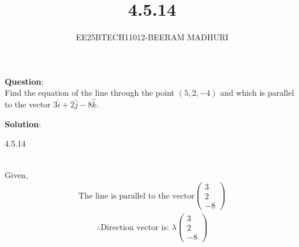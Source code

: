 \documentclass[journal]{IEEEtran}
\begin{document}

\vspace{3cm}

\title{4.5.14}
\author{EE25BTECH11012-BEERAM MADHURI}
{\let\newpage\relax\maketitle}

\renewcommand{\thefigure}{\theenumi}
\renewcommand{\thetable}{\theenumi}
\setlength{\intextsep}{10pt} %


\renewcommand{\thetable}{\theenumi}


\textbf{Question}:\\
 Find the equation of the line through the point $(5, 2, -4)$ and which is parallel to the vector $3\hat{i} + 2\hat{j} - 8\hat{k}$.

\textbf{Solution}:\\
\begin{table}[h!]
    \centering
    
    \caption{4.5.14}
    \label{table 4.5.14}
\end{table}\\
Given,
\begin{align}
\text{The line is parallel to the vector}
\begin{pmatrix}3 \\2 \\-8\end{pmatrix}
\end{align}
\begin{align}
\therefore \text{Direction vector is: } \lambda\begin{pmatrix}
3 \\
2 \\
-8
\end{pmatrix}
\end{align}
\end{document}
